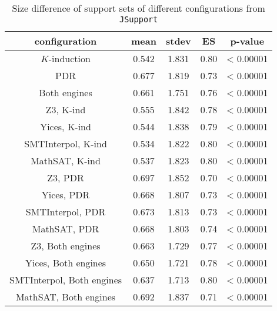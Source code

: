 \begin{table}
  \centering
  \begin{tabular}{|c|c|c|c|c|}
     \hline
     configuration & mean & stdev & ES & p-value \\[0.5ex]
     \hline\hline
     $K$-induction  & 0.542 & 1.831 & 0.80 & < 0.00001\\[0.5ex] %
     PDR & 0.677 & 1.819 & 0.73 & < 0.00001\\[0.5ex] %
     Both engines & 0.661 & 1.751 & 0.76 & < 0.00001\\[0.5ex]
     \hline
     Z3, K-ind & 0.555 & 1.842 & 0.78 & < 0.00001\\[0.5ex]%
     Yices, K-ind  & 0.544 & 1.838 & 0.79 & < 0.00001\\[0.5ex]
     SMTInterpol, K-ind & 0.534 & 1.822 & 0.80 & < 0.00001\\[0.5ex]
     MathSAT, K-ind  & 0.537 & 1.823 & 0.80 & < 0.00001\\[0.5ex]
     \hline
     Z3, PDR & 0.697 & 1.852 & 0.70 & < 0.00001\\[0.5ex]%
     Yices, PDR  & 0.668 & 1.807 & 0.73 & < 0.00001\\[0.5ex]
     SMTInterpol, PDR  & 0.673 & 1.813 & 0.73 & < 0.00001\\[0.5ex]
     MathSAT, PDR  & 0.668 & 1.803 & 0.74 & < 0.00001\\[0.5ex]
     \hline
     Z3, Both engines & 0.663 & 1.729 & 0.77 & < 0.00001\\[0.5ex]
     Yices, Both engines  & 0.650 & 1.721 & 0.78 & < 0.00001\\[0.5ex]
     SMTInterpol, Both engines  & 0.637 & 1.713 & 0.80 & < 0.00001\\[0.5ex]
     MathSAT, Both engines & 0.692 & 1.837 & 0.71 & < 0.00001\\[0.5ex]
     \hline
   \end{tabular}
     \caption{Size difference of support sets of different configurations from \texttt{JSupport}}\label{tab:minimality}
\end{table}


